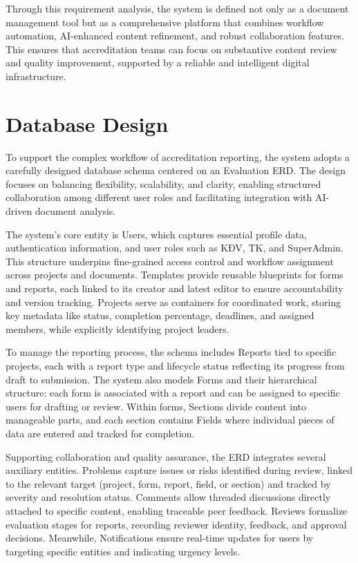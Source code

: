 Through this requirement analysis, the system is defined not only as a document management tool but as a comprehensive platform that combines workflow automation, AI-enhanced content refinement, and robust collaboration features. This ensures that accreditation teams can focus on substantive content review and quality improvement, supported by a reliable and intelligent digital infrastructure.



\section{Database Design}
To support the complex workflow of accreditation reporting, the system adopts a carefully designed database schema centered on an Evaluation ERD. The design focuses on balancing flexibility, scalability, and clarity, enabling structured collaboration among different user roles and facilitating integration with AI-driven document analysis.

The system’s core entity is Users, which captures essential profile data, authentication information, and user roles such as KĐV, TK, and SuperAdmin. This structure underpins fine-grained access control and workflow assignment across projects and documents. Templates provide reusable blueprints for forms and reports, each linked to its creator and latest editor to ensure accountability and version tracking. Projects serve as containers for coordinated work, storing key metadata like status, completion percentage, deadlines, and assigned members, while explicitly identifying project leaders.

To manage the reporting process, the schema includes Reports tied to specific projects, each with a report type and lifecycle status reflecting its progress from draft to submission. The system also models Forms and their hierarchical structure: each form is associated with a report and can be assigned to specific users for drafting or review. Within forms, Sections divide content into manageable parts, and each section contains Fields where individual pieces of data are entered and tracked for completion.

Supporting collaboration and quality assurance, the ERD integrates several auxiliary entities. Problems capture issues or risks identified during review, linked to the relevant target (project, form, report, field, or section) and tracked by severity and resolution status. Comments allow threaded discussions directly attached to specific content, enabling traceable peer feedback. Reviews formalize evaluation stages for reports, recording reviewer identity, feedback, and approval decisions. Meanwhile, Notifications ensure real-time updates for users by targeting specific entities and indicating urgency levels.

